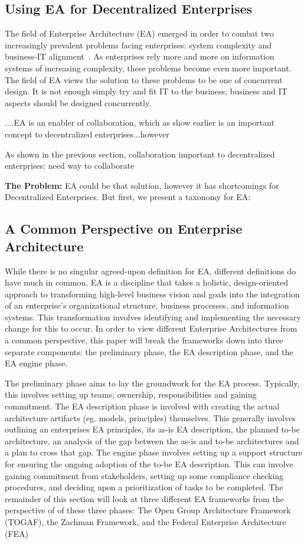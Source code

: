 \subsection{Using EA for Decentralized Enterprises}
The field of Enterprise Architecture (EA) emerged in order to combat two increasingly prevalent problems facing enterprises: system complexity and business-IT alignment~\cite{sessions2007}. As enterprises rely more and more on information systems of increasing complexity, these problems become even more important. The field of EA views the solution to these problems to be one of concurrent design. It is not enough simply try and fit IT to the business; business and IT aspects should be designed concurrently.

....EA is an enabler of collaboration, which as show earlier is an important concept to decentralized enterprises...however 
   
As shown in the previous section, collaboration important to decentralized enterprises: need way to collaborate
    
\textbf{The Problem: }EA could be that solution, however it has shortcomings for Decentralized Enterprises. But first, we present a taxonomy for EA:

\subsection{A Common Perspective on Enterprise Architecture}
While there is no singular agreed-upon definition for EA, different definitions\cite{jungle2004,GartnerInc,ross2006,pearlson2009,lankhorst2009,sessions2007,togaf9.1} do have much in common. EA is a discipline that takes a holistic, design-oriented approach to transforming high-level business vision and goals into the integration of an enterprise's organizational structure, business processes, and information systems. This transformation involves identifying and implementing the necessary change for this to occur. In order to view different Enterprise Architectures from a common perspective, this paper will break the frameworks down into three separate components: the preliminary phase, the EA description phase, and the EA engine phase. 

The preliminary phase aims to lay the groundwork for the EA process. Typically, this involves setting up teams, ownership, responsibilities and gaining commitment. The EA description phase is involved with creating the actual architecture artifacts (eg. models, principles) themselves. This generally involves outlining an enterprises EA principles, its as-is EA description,  the planned to-be architecture, an analysis of the gap between the as-is and to-be architectures and a plan to cross that gap. The engine  phase involves setting up a support structure for ensuring the ongoing adoption of the to-be EA description. This can involve gaining commitment from stakeholders, setting up some compliance checking procedures, and deciding upon a prioritization of tasks to be completed. The remainder of this section will look at three different EA frameworks from the perspective of of these three phases: The Open Group Architecture Framework (TOGAF), the Zachman Framework, and the Federal Enterprise Architecture (FEA)

